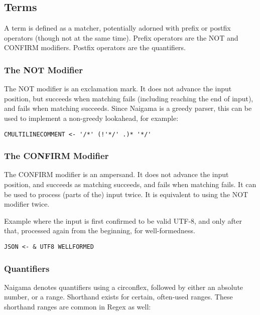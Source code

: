 \subsection{Terms}

A term is defined as a matcher, potentially adorned with prefix
or postfix operators (though not at the same time).
Prefix operators are the NOT and CONFIRM modifiers.
Postfix operators are the quantifiers.

\subsubsection{The NOT Modifier}

The NOT modifier is an exclamation mark.
It does not advance the input position, but succeeds
when matching fails (including reaching the end of input),
and fails when matching succeeds.
Since Naigama is a greedy parser,
this can be used to implement a non-greedy lookahead, for example:
 
\begin{myquote}
\begin{verbatim}
CMULTILINECOMMENT <- '/*' (!'*/' .)* '*/'
\end{verbatim}
\end{myquote}

\subsubsection{The CONFIRM Modifier}

The CONFIRM modifier is an ampersand.
It does not advance the input position, and succeeds
as matching succeeds, and fails when matching fails.
It can be used to process (parts of the) input twice.
It is equivalent to using the NOT modifier twice.

Example where the input is first confirmed to be valid UTF-8,
and only after that, processed again from the beginning, for
well-formedness.
\begin{myquote}
\begin{verbatim}
JSON <- & UTF8 WELLFORMED
\end{verbatim}
\end{myquote}

\subsubsection{Quantifiers}

Naigama denotes quantifiers using a circonflex, followed by either
an absolute number, or a range. Shorthand exists for certain, often-used
ranges. These shorthand ranges are common in Regex as well:

